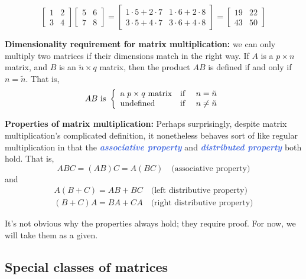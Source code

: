 \documentclass[10pt]{article}
\newcommand{\demph}[1]{\textcolor{RoyalBlue}{\textbf{\slshape #1}}} %
\theoremstyle{definition}
\newcommand{\Fl}[1]{\vspace{5mm}\noindent\textbf{#1}}%
\begin{document}
\begin{equation*}
  \begin{bmatrix}
    1&2\\
    3&4
  \end{bmatrix}
  \begin{bmatrix}
    5&6\\
    7&8
  \end{bmatrix}
  =
  \begin{bmatrix}
    1\cdot 5+2\cdot7 & 1\cdot 6 + 2\cdot8\\
    3\cdot 5+4\cdot7 & 3\cdot 6 + 4\cdot8
  \end{bmatrix}
  =
  \begin{bmatrix}
    19&22\\
    43&50
  \end{bmatrix}
\end{equation*}

\Fl{Dimensionality requirement for matrix multiplication:} we can only multiply
two matrices if their dimensions match in the right way. If $A$ is a
$p\times n$ matrix, and $B$ is an $\tilde{n} \times q$ matrix, then the
product $AB$ is defined if and only if $n=\tilde{n}$. That is,
\begin{equation*}
  AB \text{ is } \left\{ \begin{array}{l@{\quad \text{if }\quad}l} \text{a $p\times q$ matrix} & n=\tilde{n} \\
      \text{undefined}& n\neq \tilde{n} \end{array}\right.
\end{equation*}

\Fl{Properties of matrix multiplication:} Perhaps surprisingly, despite
matrix multiplication's complicated definition, it nonetheless behaves sort of
like regular multiplication in that the \demph{associative property} and
\demph{distributed property} both hold. That is,
\begin{equation*}
  ABC = (AB)C = A(BC) \quad \text{(associative property)}
\end{equation*}
and
\begin{gather*}
  A(B+C) = AB+BC \quad \text{(left distributive property)}\\
  (B+C)A = BA+CA \quad \text{(right distributive property)}
\end{gather*}

It's not obvious why the properties always hold; they require proof. For now,
we will take them as a given.


\subsection{Special classes of matrices }
\end{document}
